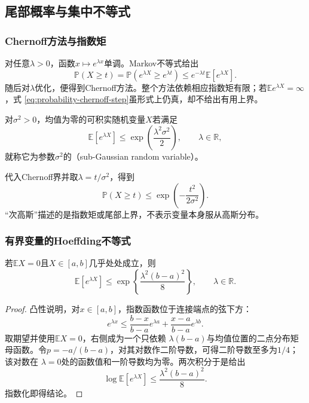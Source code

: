 \subsection{尾部概率与集中不等式}
\label{sec:probability-concentration-inequalities}

\subsubsection{Chernoff方法与指数矩}

对任意\(\lambda>0\)，函数\(x\mapsto e^{\lambda x}\)单调。Markov不等式给出
\begin{equation}
  \mathbb{P}(X\geq t)
  =
  \mathbb{P}(e^{\lambda X}\geq e^{\lambda t})
  \leq
  e^{-\lambda t}\mathbb{E}[e^{\lambda X}].
  \label{eq:probability-chernoff-step}
\end{equation}
随后对\(\lambda\)优化，便得到Chernoff方法。整个方法依赖相应指数矩有限；若\(\mathbb{E}e^{\lambda X}=\infty\)，式
\eqref{eq:probability-chernoff-step}虽形式上仍真，却不给出有用上界。

\begin{definition}[次高斯变量]
  \label{def:probability-subgaussian}
对\(\sigma^2>0\)，均值为零的可积实随机变量\(X\)若满足
\[ \mathbb{E}[e^{\lambda X}]
  \leq\exp\left(\frac{\lambda^2\sigma^2}{2}\right),\qquad \lambda\in\mathbb{R}, \]
就称它为参数\(\sigma^2\)的（sub-Gaussian random variable）。
\end{definition}
代入Chernoff界并取\(\lambda=t/\sigma^2\)，得到
\[ \mathbb{P}(X\geq t)
  \leq\exp\left(-\frac{t^2}{2\sigma^2}\right). \]
“次高斯”描述的是指数矩或尾部上界，不表示变量本身服从高斯分布。

\subsubsection{有界变量的Hoeffding不等式}

\begin{lemma}[Hoeffding引理]
\label{lem:probability-hoeffding-lemma}
若\(\mathbb{E}X=0\)且\(X\in[a,b]\)几乎处处成立，则
\[ \mathbb{E}[e^{\lambda X}]
  \leq\exp\left\{\frac{\lambda^2(b-a)^2}{8}\right\},\qquad \lambda\in\mathbb{R}. \]
\end{lemma}

\begin{proof}
凸性说明，对\(x\in[a,b]\)，指数函数位于连接端点的弦下方：
\[ e^{\lambda x}
  \leq\frac{b-x}{b-a}e^{\lambda a}+\frac{x-a}{b-a}e^{\lambda b}. \]
取期望并使用\(\mathbb{E}X=0\)，右侧成为一个只依赖
\(\lambda(b-a)\)与均值位置的二点分布矩母函数。令\(p=-a/(b-a)\)，对其对数作二阶导数，可得二阶导数至多为\(1/4\)；该对数在
\(\lambda=0\)处的函数值和一阶导数均为零。两次积分于是给出
\[ \log\mathbb{E}[e^{\lambda X}]
  \leq\frac{\lambda^2(b-a)^2}{8}. \]
指数化即得结论。
\end{proof}

